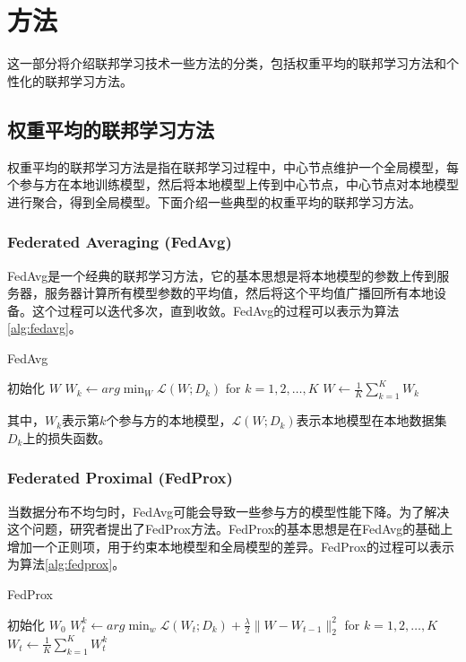 \section{方法}

这一部分将介绍联邦学习技术一些方法的分类，包括权重平均的联邦学习方法和个性化的联邦学习方法。

\subsection{权重平均的联邦学习方法}

权重平均的联邦学习方法是指在联邦学习过程中，中心节点维护一个全局模型，每个参与方在本地训练模型，然后将本地模型上传到中心节点，中心节点对本地模型进行聚合，得到全局模型。下面介绍一些典型的权重平均的联邦学习方法。

\subsubsection{Federated Averaging (FedAvg)}

FedAvg\cite{mcmahan2017communication}是一个经典的联邦学习方法，它的基本思想是将本地模型的参数上传到服务器，服务器计算所有模型参数的平均值，然后将这个平均值广播回所有本地设备。这个过程可以迭代多次，直到收敛。FedAvg的过程可以表示为算法\ref{alg:fedavg}。

\begin{algorithm}[htbp]
\caption{FedAvg}
\label{alg:fedavg}
\begin{algorithmic}[1]
    \State 初始化 $W$
        \State $W_k \leftarrow arg\min_W \mathcal{L}(W;D_k)$ for $k=1,2,\ldots,K$
        \State $W \leftarrow \frac{1}{K}\sum_{k=1}^K W_k$
    \EndFor
\end{algorithmic}
\end{algorithm}

其中，$W_k$表示第$k$个参与方的本地模型，$\mathcal{L}(W;D_k)$表示本地模型在本地数据集$D_k$上的损失函数。

\subsubsection{Federated Proximal (FedProx)}

当数据分布不均匀时，FedAvg可能会导致一些参与方的模型性能下降。为了解决这个问题，研究者提出了FedProx\cite{li2020federated}方法。FedProx的基本思想是在FedAvg的基础上增加一个正则项，用于约束本地模型和全局模型的差异。FedProx的过程可以表示为算法\ref{alg:fedprox}。

\begin{algorithm}[htbp]
\caption{FedProx}
\label{alg:fedprox}
\begin{algorithmic}[1]
    \State 初始化 $W_0$
        \State $W_t^k \leftarrow arg\min_w \mathcal{L}(W_t;D_k) + \frac{\lambda}{2}\|W-W_{t-1}\|_2^2$ for $k=1,2,\ldots,K$
        \State $W_t \leftarrow \frac{1}{K}\sum_{k=1}^K W_t^k$
    \EndFor
\end{algorithmic}
\end{algorithm}

